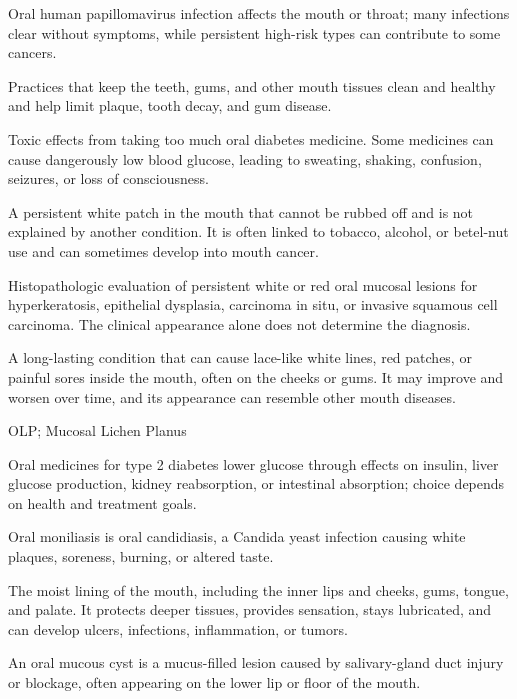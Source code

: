  Oral human papillomavirus infection affects the mouth or throat; many infections clear without symptoms, while persistent high-risk types can contribute to some cancers.

 Practices that keep the teeth, gums, and other mouth tissues clean and healthy and help limit plaque, tooth decay, and gum disease.

 Toxic effects from taking too much oral diabetes medicine. Some medicines can cause dangerously low blood glucose, leading to sweating, shaking, confusion, seizures, or loss of consciousness.

 A persistent white patch in the mouth that cannot be rubbed off and is not explained by another condition. It is often linked to tobacco, alcohol, or betel-nut use and can sometimes develop into mouth cancer.

 Histopathologic evaluation of persistent white or red oral mucosal lesions for hyperkeratosis, epithelial dysplasia, carcinoma in situ, or invasive squamous cell carcinoma. The clinical appearance alone does not determine the diagnosis.

 A long-lasting condition that can cause lace-like white lines, red patches, or painful sores inside the mouth, often on the cheeks or gums. It may improve and worsen over time, and its appearance can resemble other mouth diseases.

\synonyms
OLP; Mucosal Lichen Planus

 Oral medicines for type 2 diabetes lower glucose through effects on insulin, liver glucose production, kidney reabsorption, or intestinal absorption; choice depends on health and treatment goals.

 Oral moniliasis is oral candidiasis, a Candida yeast infection causing white plaques, soreness, burning, or altered taste.

 The moist lining of the mouth, including the inner lips and cheeks, gums, tongue, and palate. It protects deeper tissues, provides sensation, stays lubricated, and can develop ulcers, infections, inflammation, or tumors.

 An oral mucous cyst is a mucus-filled lesion caused by salivary-gland duct injury or blockage, often appearing on the lower lip or floor of the mouth.

